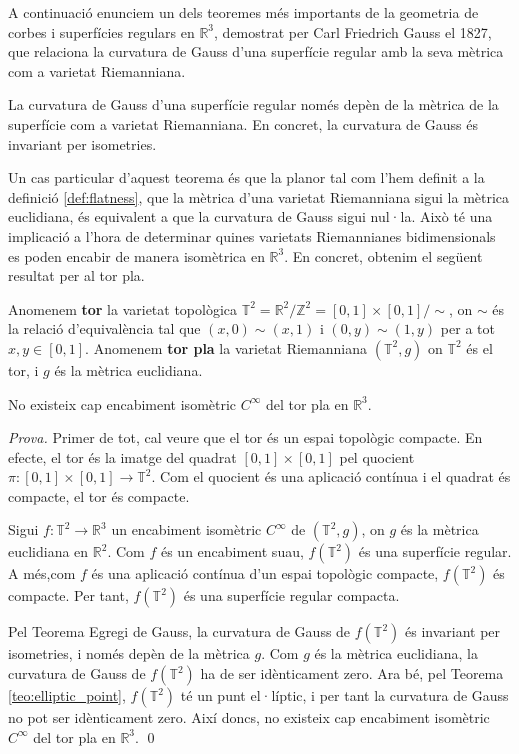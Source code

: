 A continuació enunciem un dels teoremes més importants de la geometria de corbes i superfícies regulars en $\mathbb R^3$, demostrat per Carl Friedrich Gauss el 1827, que relaciona la curvatura de Gauss d'una superfície regular amb la seva mètrica com a varietat Riemanniana.

\begin{teo}
    La curvatura de Gauss d'una superfície regular només depèn de la mètrica de la superfície com a varietat Riemanniana. En concret, la curvatura de Gauss és invariant per isometries. 
\end{teo}

Un cas particular d'aquest teorema és que la planor tal com l'hem definit a la definició \ref{def:flatness}, que la mètrica d'una varietat Riemanniana sigui la mètrica euclidiana, és equivalent a que la curvatura de Gauss sigui nul·la. Això té una implicació a l'hora de determinar quines varietats Riemannianes bidimensionals es poden encabir de manera isomètrica en $\mathbb R^3$. En concret, obtenim el següent resultat per al tor pla. 

\begin{defi}
    Anomenem \textbf{tor} la varietat topològica $\mathbb T^2 = \mathbb R^2/\mathbb Z^2 = [0,1]\times[0,1]/\sim$, on $\sim$ és la relació d'equivalència tal que $(x,0)\sim(x,1)$ i $(0,y)\sim(1,y)$ per a tot $x,y\in[0,1]$. Anomenem \textbf{tor pla} la varietat Riemanniana $(\mathbb T^2, g)$ on $\mathbb T^2$ és el tor, i $g$ és la mètrica euclidiana.
\end{defi}

\begin{teo}
    No existeix cap encabiment isomètric $C^\infty$ del tor pla en $\mathbb R^3$.
\end{teo}
{
    \color{green!50!black}
    \textit{Prova.}
    Primer de tot, cal veure que el tor és un espai topològic compacte. En efecte, el tor és la imatge del quadrat $[0,1]\times[0,1]$ pel quocient $\pi:[0,1]\times[0,1]\to\mathbb T^2$. Com el quocient és una aplicació contínua i el quadrat és compacte, el tor és compacte.

    Sigui $f:\mathbb T^2\to\mathbb R^3$ un encabiment isomètric $C^\infty$ de $(\mathbb T^2, g)$, on $g$ és la mètrica euclidiana en $\mathbb R^2$. Com $f$ és un encabiment suau, $f(\mathbb T^2)$ és una superfície regular. A més,com $f$ és una aplicació contínua d'un espai topològic compacte, $f(\mathbb T^2)$ és compacte. Per tant, $f(\mathbb T^2)$ és una superfície regular compacta.

    Pel Teorema Egregi de Gauss, la curvatura de Gauss de $f(\mathbb T^2)$ és invariant per isometries, i només depèn de la mètrica $g$. Com $g$ és la mètrica euclidiana, la curvatura de Gauss de $f(\mathbb T^2)$ ha de ser idènticament zero. Ara bé, pel Teorema \ref{teo:elliptic_point}, $f(\mathbb T^2)$ té un punt el·líptic, i per tant la curvatura de Gauss no pot ser idènticament zero. Així doncs, no existeix cap encabiment isomètric $C^\infty$ del tor pla en $\mathbb R^3$.
    \qed
}



\newpage
